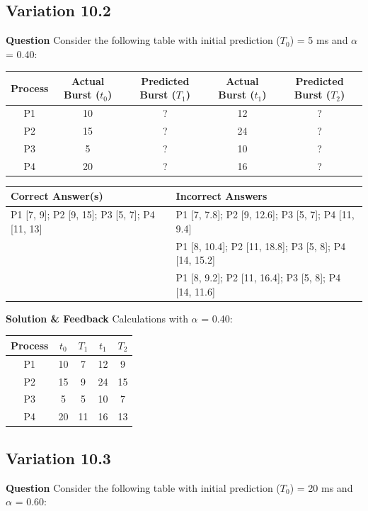 \subsection{Variation 10.2}
\textbf{Question}
Consider the following table with initial prediction ($T_0$) = 5 ms and $\alpha$ = 0.40:

\begin{center}
\begin{tabular}{|c|c|c|c|c|}
\hline
Process & Actual Burst ($t_0$) & Predicted Burst ($T_1$) & Actual Burst ($t_1$) & Predicted Burst ($T_2$) \\
\hline
P1 & 10 & ? & 12 & ? \\
P2 & 15 & ? & 24 & ? \\
P3 & 5 & ? & 10 & ? \\
P4 & 20 & ? & 16 & ? \\
\hline
\end{tabular}
\end{center}

\begin{center}
\begin{tabular}{|l|l|}
\hline
\textbf{Correct Answer(s)} & \textbf{Incorrect Answers} \\
\hline
P1 [7, 9]; P2 [9, 15]; P3 [5, 7]; P4 [11, 13] & P1 [7, 7.8]; P2 [9, 12.6]; P3 [5, 7]; P4 [11, 9.4] \\
 & P1 [8, 10.4]; P2 [11, 18.8]; P3 [5, 8]; P4 [14, 15.2] \\
 & P1 [8, 9.2]; P2 [11, 16.4]; P3 [5, 8]; P4 [14, 11.6] \\
\hline
\end{tabular}
\end{center}

\textbf{Solution \& Feedback}
Calculations with $\alpha$ = 0.40:

\begin{center}
\begin{tabular}{|c|c|c|c|c|}
\hline
Process & $t_0$ & $T_1$ & $t_1$ & $T_2$ \\
\hline
P1 & 10 & 7 & 12 & 9 \\
P2 & 15 & 9 & 24 & 15 \\
P3 & 5 & 5 & 10 & 7 \\
P4 & 20 & 11 & 16 & 13 \\
\hline
\end{tabular}
\end{center}

\subsection{Variation 10.3}
\textbf{Question}
Consider the following table with initial prediction ($T_0$) = 20 ms and $\alpha$ = 0.60:

